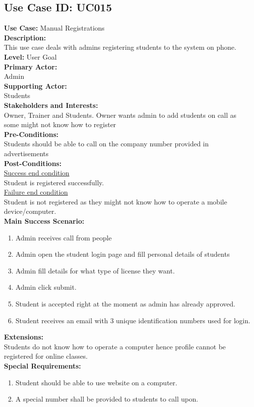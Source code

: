 \documentclass{report}
\begin{document}
\subsection{\textbf{Use Case ID:} UC015}
\textbf{Use Case:} Manual Registrations\\[0.3cm]
\textbf{Description:}\\
This use case deals with admins registering students to the system on phone.\\[0.3cm]
\textbf{Level:} User Goal\\[0.3cm]
\textbf{Primary Actor:}\\
Admin\\[0.3cm]
\textbf{Supporting Actor:}\\
Students\\[0.3cm]
\textbf{Stakeholders and Interests:}\\
Owner, Trainer and Students. Owner wants admin to add students on call as some might not know how to register\\[0.3cm]
\textbf{Pre-Conditions:}\\
Students should be able to call on the company number provided in advertisements\\[0.3cm]
\textbf{Post-Conditions:}\\
\underline{Success end condition}\\
Student is registered successfully.\\[0.3cm]
\underline{Failure end condition}\\
Student is not registered as they might not know how to operate a mobile device/computer.\\[0.3cm]
\textbf{\large {Main Success Scenario:}}
\begin{enumerate}
    \item Admin receives call from people
    \item Admin open the student login page and fill personal details of students
    \item Admin fill details for what type of license they want.
    \item Admin click submit.
    \item Student is accepted right at the moment as admin has already approved.
    \item Student receives an email with 3 unique identification numbers used for login.
\end{enumerate}
\textbf{Extensions:}\\
Students do not know how to operate a computer hence profile cannot be registered for online classes.\\[0.3cm]
\textbf{Special Requirements:}
\begin{enumerate}
    \item Student should be able to use website on a computer.
    \item A special number shall be provided to students to call upon.
\end{enumerate}
\end{document}

